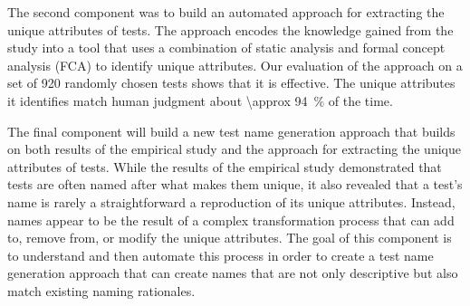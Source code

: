 The second component was to build an automated approach for extracting the unique attributes of tests.
% 
The approach encodes the knowledge gained from the study into a tool that uses a combination of static analysis and formal concept analysis (FCA) to identify unique attributes. 
%
Our evaluation of the approach on a set of \num{920} randomly chosen tests shows that it is effective.
%
The unique attributes it identifies match human judgment about \SI{\approx 94}{\percent} of the time.


The final component will build a new test name generation approach that builds on both results of the empirical study and the approach for extracting the unique attributes of tests.
%
While the results of the empirical study demonstrated that tests are often named after what makes them unique, it also revealed that a test's name is rarely a straightforward a reproduction of its unique attributes.
%
Instead, names appear to be the result of a complex transformation process that can add to, remove from, or modify the unique attributes.
%
The goal of this component is to understand and then automate this process in order to create a test name generation approach that can create names that are not only descriptive but also match existing naming rationales.